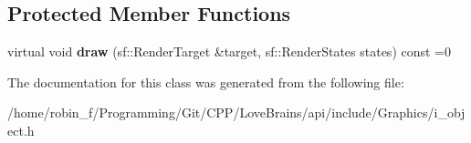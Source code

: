 \subsection*{Protected Member Functions}
\begin{DoxyCompactItemize}
\item 
\hypertarget{class_graphics_1_1_i_object_a1bbb236da76f9cff3750afb768be6260}{}virtual void {\bfseries draw} (sf\+::\+Render\+Target \&target, sf\+::\+Render\+States states) const  =0\label{class_graphics_1_1_i_object_a1bbb236da76f9cff3750afb768be6260}

\end{DoxyCompactItemize}


The documentation for this class was generated from the following file\+:\begin{DoxyCompactItemize}
\item 
/home/robin\+\_\+f/\+Programming/\+Git/\+C\+P\+P/\+Love\+Brains/api/include/\+Graphics/i\+\_\+object.\+h\end{DoxyCompactItemize}
